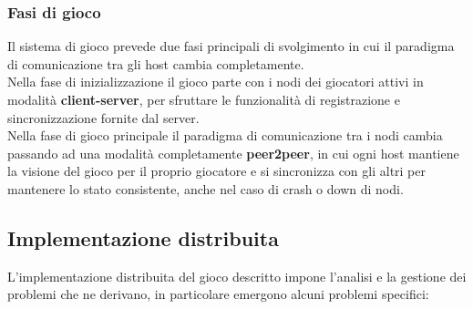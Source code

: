\documentclass[10pt,a4paper]{article}
\begin{document}
\subsubsection{Fasi di gioco}
Il sistema di gioco prevede due fasi principali di svolgimento in cui il paradigma di comunicazione tra gli host cambia completamente. \\Nella fase di inizializzazione il gioco parte con i nodi dei giocatori attivi in modalità \textbf{client-server}, per sfruttare le funzionalità di registrazione e sincronizzazione fornite dal server. \\Nella fase di gioco principale il paradigma di comunicazione tra i nodi cambia passando ad una modalità completamente \textbf{peer2peer}, in cui ogni host mantiene la visione del gioco per il proprio giocatore e si sincronizza con gli altri per mantenere lo stato consistente, anche nel caso di crash o down di nodi.

\subsection{Implementazione distribuita}
L'implementazione distribuita del gioco descritto impone l'analisi e la gestione dei problemi che ne derivano, in particolare emergono alcuni problemi specifici:
\end{document}
